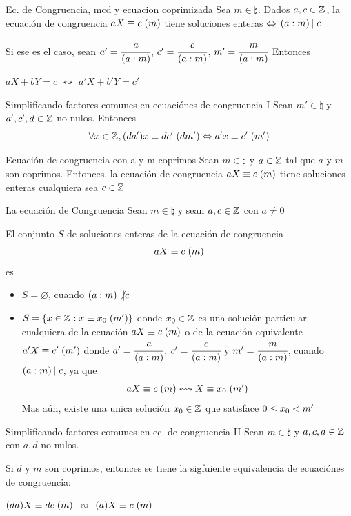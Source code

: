 \documentclass[10pt]{article}
\begin{document}
\begin{propo}{Ec. de Congruencia, mcd y ecuacion coprimizada}
 Sea $m \in \natural{}$. Dados $a,c \in \mathbb{Z}^{}$, la ecuación de congruencia $aX \equiv c \hspace{0.1cm} (m)$ tiene soluciones enteras $\Leftrightarrow$ $(a:m)\left\vert\right.c$
 
 Si ese es el caso, sean $a' = \cfrac{a}{(a:m)}$, $c' = \cfrac{c}{(a:m)}$, $m' = \cfrac{m}{(a:m)}$
Entonces
 \begin{center}
   $aX + bY =c$ $\leftrightsquigarrow$ $a'X + b'Y =c'$
  \end{center}
 \end{propo}

\begin{obs}{Simplificando factores comunes en ecuaciónes de congruencia-I}
 Sean $m' \in \natural{}$ y $a',c',d \in \mathbb{Z}^{}$ no nulos. Entonces
 \[\forall x \in \mathbb{Z}^{}, (d a')x \equiv d c' \hspace{0.1cm} (d m') \Leftrightarrow a' x \equiv c' \hspace{0.1cm} (m')\]
\end{obs}

\begin{cor}{Ecuación de congruencia con a y m coprimos}
 Sean $m \in \natural{}$ y $a \in \mathbb{Z}^{}$ tal que $a$ y $m$ son coprimos. Entonces, la ecuación de congruencia $aX \equiv c \hspace{0.1cm} (m)$ tiene soluciones enteras cualquiera sea $c \in \mathbb{Z}^{}$
\end{cor}

\begin{teo}{La ecuación de Congruencia}
 Sean $m \in \natural{}$ y sean $a, c \in \mathbb{Z}^{}$ con $a \neq 0$

 El conjunto $S$ de soluciones enteras de la ecuación de congruencia
 \[aX \equiv c \hspace{0.1cm} (m)\]
 es\begin{itemize}
    \item $S = \varnothing$, cuando $(a:m) \not\vert c$
    \item $S = \{x \in \mathbb{Z}^{}: x \equiv x_0 \hspace{0.1cm} (m')\}$ donde $x_0 \in \mathbb{Z}^{}$ es una solución particular cualquiera de la ecuación $aX \equiv c \hspace{0.1cm} (m)$ o de la ecuación equivalente $a' X \equiv c' \hspace{0.1cm} (m')$ donde $a' = \cfrac{a}{(a:m)}$, $c' = \cfrac{c}{(a:m)}$ y $m' = \cfrac{m}{(a:m)}$, cuando $(a:m)\left\vert\right.c$, ya que 
    \[a X \equiv c \hspace{0.1cm} (m) \leftrightsquigarrow X \equiv x_0 \hspace{0.1cm} (m')\]
    Mas aún, existe una unica solución $x_0 \in \mathbb{Z}^{}$ que satisface $0 \leq x_0 < m'$
    \end{itemize}
 \end{teo}

\begin{obs}{Simplificando factores comunes en ec. de congruencia-II}
 Sean $m \in \natural{}$ y $a,c,d \in \mathbb{Z}^{}$ con $a,d$ no nulos.
 
 Si $d$ y $m$ son coprimos, entonces se tiene la sigfuiente equivalencia de ecuaciónes de congruencia:
 \begin{center}
  $(d a)X \equiv d c \hspace{0.1cm} (m)$ $\leftrightsquigarrow$ $(a)X \equiv c \hspace{0.1cm} (m)$
 \end{center}

\end{obs}
\end{document}
